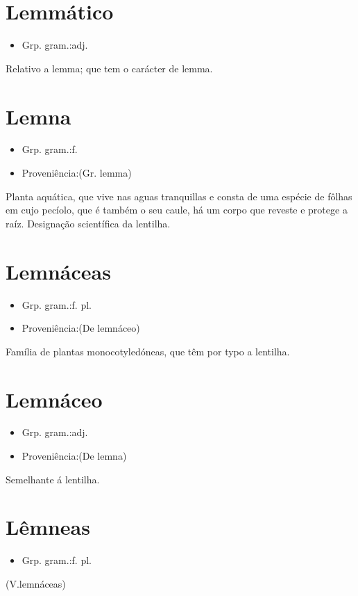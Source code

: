 \section{Lemmático}
\begin{itemize}
\item {Grp. gram.:adj.}
\end{itemize}
Relativo a lemma; que tem o carácter de lemma.
\section{Lemna}
\begin{itemize}
\item {Grp. gram.:f.}
\end{itemize}
\begin{itemize}
\item {Proveniência:(Gr. \textunderscore lemma\textunderscore )}
\end{itemize}
Planta aquática, que vive nas aguas tranquillas e consta de uma espécie de fôlhas em cujo pecíolo, que é também o seu caule, há um corpo que reveste e protege a raíz.
Designação scientífica da lentilha.
\section{Lemnáceas}
\begin{itemize}
\item {Grp. gram.:f. pl.}
\end{itemize}
\begin{itemize}
\item {Proveniência:(De \textunderscore lemnáceo\textunderscore )}
\end{itemize}
Família de plantas monocotyledóneas, que têm por typo a lentilha.
\section{Lemnáceo}
\begin{itemize}
\item {Grp. gram.:adj.}
\end{itemize}
\begin{itemize}
\item {Proveniência:(De \textunderscore lemna\textunderscore )}
\end{itemize}
Semelhante á lentilha.
\section{Lêmneas}
\begin{itemize}
\item {Grp. gram.:f. pl.}
\end{itemize}
(V.lemnáceas)

